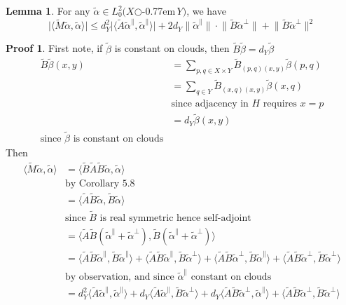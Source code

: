 \documentclass{book}
\newcommand{\zigzag}{$\bigcirc$\kern-0.77em\raisebox{-.16ex}{\small Z}$\,$}
\newcommand{\inner}[1]{\langle #1 \rangle}
\newcommand{\norm}[1]{\lVert #1 \rVert}
\newcommand{\abs}[1]{\lvert #1 \rvert }
\theoremstyle{definition}
\newtheorem{lemma}{Lemma}[chapter]
\theoremstyle{remarkstyle}
\newtheorem*{myproof}{Proof}%
\begin{document}
\begin{lemma}
    For any $\tilde{\alpha}\in L^{2}_{0}(X$\zigzag$Y)$, we have 
    $$
    \abs{\inner{\tilde{M}\tilde{\alpha}, \tilde{\alpha}}} \le d^2_{Y}\abs{\inner{\tilde{A}\tilde{\alpha}^{\parallel}, \tilde{\alpha}^{\parallel} } } + 2d_Y\norm{\tilde{\alpha}^{\parallel} }\cdot \norm{\tilde{B}\tilde{\alpha}^{\perp}} + \norm{\tilde{B}\tilde{\alpha}^{\perp}}^{2}
    $$
\end{lemma}
\begin{myproof}
    First note, if $\tilde{\beta}$ is constant on clouds, then $\tilde{B}\tilde{\beta}=d_Y\tilde{\beta}$
    \begin{align*}
        \tilde{B}\tilde{\beta}(x,y) 
        &= \sum_{p,q\in X\times Y}\tilde{B}_{(p,q)(x,y)}\tilde{\beta}(p,q) \\
        &= \sum_{q\in Y}\tilde{B}_{(x,q)(x,y)}\tilde{\beta}(x,q) \\
        &\textrm{since adjacency in $H$ requires $x=p$} \\
        &= d_Y\tilde{\beta}(x,y)\\
        \textrm{since $\tilde{\beta}$ is constant on clouds}
    \end{align*}
    Then 
    \begin{align*}
        \inner{\tilde{M}\tilde{\alpha}, \tilde{\alpha}} 
        &= \inner{\tilde{B}\tilde{A}\tilde{B}\tilde{\alpha}, \tilde{\alpha}} \\
        &\textrm{by Corollary 5.8}\\
        &= \inner{\tilde{A}\tilde{B}\tilde{\alpha}, \tilde{B}\tilde{\alpha}} \\
        &\textrm{since $\tilde{B}$ is real symmetric hence self-adjoint} \\
        &= \inner{\tilde{A}\tilde{B}(\tilde{\alpha}^{\parallel}+\tilde{\alpha}^{\perp}) , \tilde{B}(\tilde{\alpha}^{\parallel}+\tilde{\alpha}^{\perp})} \\
        &= \inner{\tilde{A}\tilde{B}\tilde{\alpha}^{\parallel}, \tilde{B}\tilde{\alpha}^{\parallel} } + \inner{\tilde{A}\tilde{B}\tilde{\alpha}^{\parallel}, \tilde{B}\tilde{\alpha}^{\perp} } + \inner{\tilde{A}\tilde{B}\tilde{\alpha}^{\perp},\tilde{B}\tilde{\alpha}^{\parallel}} + \inner{\tilde{A}\tilde{B}\tilde{\alpha}^{\perp},\tilde{B}\tilde{\alpha}^{\perp}} \\
        &\textrm{by observation, and since $\tilde{\alpha}^{\parallel}$ constant on clouds} \\
        &= d^2_Y\inner{\tilde{A}\tilde{\alpha}^{\parallel},\tilde{\alpha}^{\parallel}} + d_Y\inner{\tilde{A}\tilde{\alpha}^{\parallel}, \tilde{B}\tilde{\alpha}^{\perp} } + d_Y\inner{\tilde{A}\tilde{B}\tilde{\alpha}^{\perp},\tilde{\alpha}^{\parallel}} + \inner{\tilde{A}\tilde{B}\tilde{\alpha}^{\perp},\tilde{B}\tilde{\alpha}^{\perp}} 

\end{align*}
\end{myproof}
\end{document}
